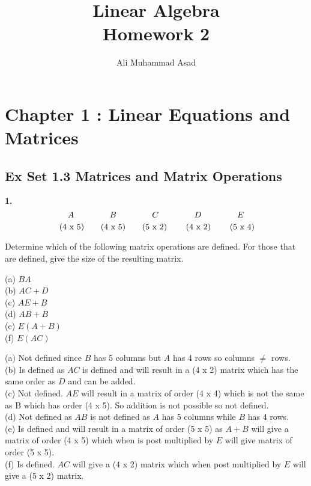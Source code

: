 \documentclass[addpoints]{exam}
\title{Linear Algebra\\ Homework 2}
\author{Ali Muhammad Asad}
\begin{document}
\maketitle
\begin{sloppypar}
\section*{\textbf{Chapter 1 : Linear Equations and Matrices}}
\subsection*{\textbf{Ex Set 1.3 Matrices and Matrix Operations}}
\begin{questions}
    \question
    \textbf{1.} $$ A \text{\hspace{15mm}} B \text{\hspace{15mm}} C \text{\hspace{15mm}} D \text{\hspace{15mm}} E$$
    $$ \text{\hspace{1mm}} (4 \text{ x } 5) \text{\hspace{7mm}} (4 \text{ x } 5) \text{\hspace{7mm}} (5 \text{ x } 2) \text{\hspace{8mm}} (4 \text{ x } 2) \text{\hspace{8mm}} (5 \text{ x } 4) $$
    
    Determine which of the following matrix operations are defined. For those that are defined, give the size of the resulting matrix. 

    (a) $ BA $ \\ (b) $ AC + D $ \\ (c) $ AE + B $ \\ (d) $ AB + B $ \\ (e) $ E(A + B) $ \\ (f) $ E(AC) $
    \begin{solution}
        
        (a) Not defined since $B$ has 5 columns but $A$ has 4 rows so columns $\neq$ rows. \\ 
        (b) Is defined as $AC$ is defined and will result in a (4 x 2) matrix which has the same order as $D$ and can be added. \\ 
        (c) Not defined. $AE$ will result in a matrix of order (4 x 4) which is not the same as B which has order (4 x 5). So addition is not possible so not defined. \\ 
        (d) Not defined as $AB$ is not defined as $A$ has 5 columns while $B$ has 4 rows. \\ 
        (e) Is defined and will result in a matrix of order (5 x 5) as $A + B$ will give a matrix of order (4 x 5) which when is post multiplied by $E$ will give matrix of order (5 x 5). \\ 
        (f) Is defined. $AC$ will give a (4 x 2) matrix which when post multiplied by $E$ will give a (5 x 2) matrix. 
    \end{solution}
    

\end{questions}
\end{sloppypar}
\end{document}
